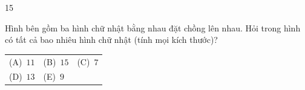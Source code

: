 \documentclass[11pt]{article}
\makeatletter
\newcommand{\choicesII}[5]{\par\smallskip\noindent
  \begin{tabularx}{\linewidth}{@{}XXX@{}}(A)\ #1&(B)\ #2&(C)\ #3\\(D)\ #4&(E)\ #5&\end{tabularx}\par}
\makeatother
\begin{document}
\begin{probbox}{15}{\relax}
\begin{minipage}[t]{0.52\linewidth}\vspace{0pt}
Hình bên gồm ba hình chữ nhật bằng nhau đặt chồng lên nhau. Hỏi trong hình có tất cả bao nhiêu hình chữ nhật (tính mọi kích thước)?
\choicesII{$11$}{$15$}{$7$}{$13$}{$9$}
\end{minipage}\hfill
\begin{minipage}[t]{0.44\linewidth}\vspace{0pt}
\centering{}
\end{minipage}
\end{probbox}
\end{document}
